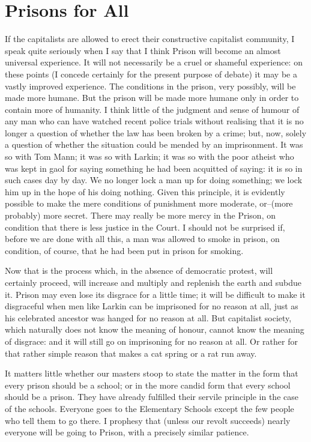\documentclass{book}
\begin{document}
\section{Prisons for All}
If the capitalists are allowed to erect their constructive capitalist community, I speak quite seriously when I say that I think Prison will become an almost universal experience. It will not necessarily be a cruel or shameful experience: on these points (I concede certainly for the present purpose of debate) it may be a vastly improved experience. The conditions in the prison, very possibly, will be made more humane. But the prison will be made more humane only in order to contain more of humanity. I think little of the judgment and sense of humour of any man who can have watched recent police trials without realising that it is no longer a question of whether the law has been broken by a crime; but, now, solely a question of whether the situation could be mended by an imprisonment. It was so with Tom Mann; it was so with Larkin; it was so with the poor atheist who was kept in gaol for saying something he had been acquitted of saying: it is so in such cases day by day. We no longer lock a man up for doing something; we lock him up in the hope of his doing nothing. Given this principle, it is evidently possible to make the mere conditions of punishment more moderate, or–(more probably) more secret. There may really be more mercy in the Prison, on condition that there is less justice in the Court. I should not be surprised if, before we are done with all this, a man was allowed to smoke in prison, on condition, of course, that he had been put in prison for smoking.

Now that is the process which, in the absence of democratic protest, will certainly proceed, will increase and multiply and replenish the earth and subdue it. Prison may even lose its disgrace for a little time; it will be difficult to make it disgraceful when men like Larkin can be imprisoned for no reason at all, just as his celebrated ancestor was hanged for no reason at all. But capitalist society, which naturally does not know the meaning of honour, cannot know the meaning of disgrace: and it will still go on imprisoning for no reason at all. Or rather for that rather simple reason that makes a cat spring or a rat run away.

It matters little whether our masters stoop to state the matter in the form that every prison should be a school; or in the more candid form that every school should be a prison. They have already fulfilled their servile principle in the case of the schools. Everyone goes to the Elementary Schools except the few people who tell them to go there. I prophesy that (unless our revolt succeeds) nearly everyone will be going to Prison, with a precisely similar patience.
\end{document}
